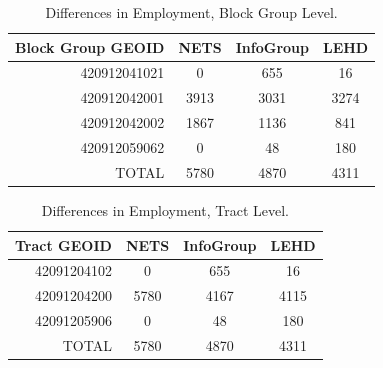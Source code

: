 \documentclass[paper = letter, fontsize = 11pt]{scrartcl}
\begin{document}
\clearpage
\pagestyle{plain}
\begin{table}
	\begin{center}
		\begin{tabular}{ r | c c c }
			Block Group GEOID & NETS & InfoGroup & LEHD \\
			\hline
			\hline
			420912041021 & 0 & 655 & 16 \\
			\hline 
			420912042001 & 3913 & 3031 & 3274 \\
			\hline 
			420912042002 & 1867 & 1136 & 841 \\
			\hline 
			420912059062 & 0 & 48 & 180 \\
			\hline
			\hline
			TOTAL & 5780 & 4870 & 4311 \\
			\hline
		\end{tabular}
	\end{center}
\caption{Differences in Employment, Block Group Level.}
\end{table}
\begin{table}
	\begin{center}
		\begin{tabular}{ r | c c c }
			Tract GEOID & NETS & InfoGroup & LEHD \\
			\hline
			\hline
			42091204102 & 0 & 655 & 16 \\
			\hline 
			42091204200 & 5780 & 4167 & 4115 \\
			\hline 
			42091205906 & 0 & 48 & 180 \\
			\hline
			\hline
			TOTAL & 5780 & 4870 & 4311 \\
			\hline
		\end{tabular}
	\end{center}
\caption{Differences in Employment, Tract Level.}
\end{table}
\end{document}
